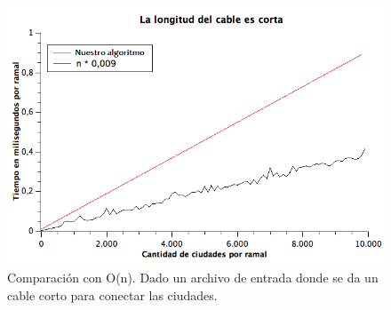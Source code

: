 \begin{figure}[H]
\begin{center}

  \includegraphics[width=\linewidth]{../graficos/ej1/CableCorto.png}
  \caption{{\small Comparación con O(n). Dado un archivo de entrada donde se da un cable corto para conectar las ciudades.}} \label{ej1-cablecorto}
\endminipage

\end{center}
\end{figure}

